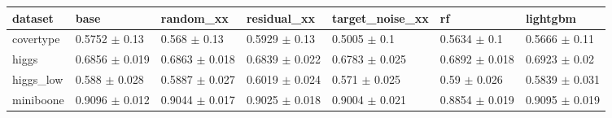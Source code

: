 \begin{tabular}{lllllll}
\toprule
dataset & base & random\_xx & residual\_xx & target\_noise\_xx & rf & lightgbm \\
\midrule
covertype & 0.5752 $\pm$ 0.13 & 0.568 $\pm$ 0.13 & 0.5929 $\pm$ 0.13 & 0.5005 $\pm$ 0.1 & 0.5634 $\pm$ 0.1 & 0.5666 $\pm$ 0.11 \\
higgs & 0.6856 $\pm$ 0.019 & 0.6863 $\pm$ 0.018 & 0.6839 $\pm$ 0.022 & 0.6783 $\pm$ 0.025 & 0.6892 $\pm$ 0.018 & 0.6923 $\pm$ 0.02 \\
higgs\_low & 0.588 $\pm$ 0.028 & 0.5887 $\pm$ 0.027 & 0.6019 $\pm$ 0.024 & 0.571 $\pm$ 0.025 & 0.59 $\pm$ 0.026 & 0.5839 $\pm$ 0.031 \\
miniboone & 0.9096 $\pm$ 0.012 & 0.9044 $\pm$ 0.017 & 0.9025 $\pm$ 0.018 & 0.9004 $\pm$ 0.021 & 0.8854 $\pm$ 0.019 & 0.9095 $\pm$ 0.019 \\
\bottomrule
\end{tabular}
